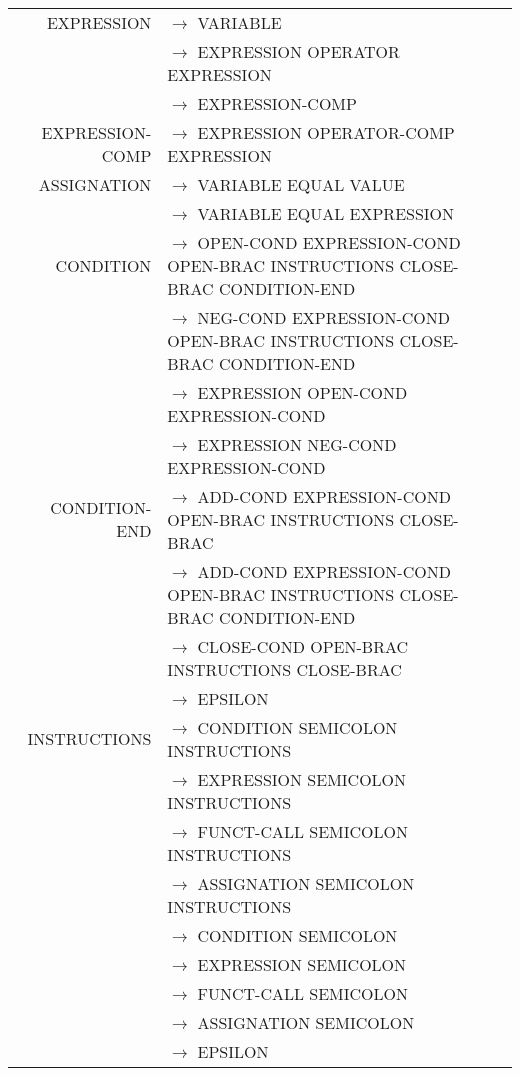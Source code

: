 \documentclass[a4paper,10pt]{article}
\begin{document}
~\\

\hspace{-4.5cm}\begin{tabular}{rl}
\hline
EXPRESSION			& $\rightarrow$ VARIABLE   \\
					& $\rightarrow$ EXPRESSION OPERATOR EXPRESSION \\ 
					& $\rightarrow$ EXPRESSION-COMP \\
EXPRESSION-COMP		& $\rightarrow$ EXPRESSION OPERATOR-COMP EXPRESSION \\
ASSIGNATION			& $\rightarrow$ VARIABLE EQUAL VALUE \\
					& $\rightarrow$ VARIABLE EQUAL EXPRESSION \\
					
CONDITION			& $\rightarrow$ OPEN-COND EXPRESSION-COND OPEN-BRAC INSTRUCTIONS CLOSE-BRAC CONDITION-END\\
					& $\rightarrow$ NEG-COND EXPRESSION-COND OPEN-BRAC INSTRUCTIONS CLOSE-BRAC CONDITION-END\\
					& $\rightarrow$ EXPRESSION OPEN-COND EXPRESSION-COND \\
					& $\rightarrow$ EXPRESSION NEG-COND EXPRESSION-COND \\


CONDITION-END		& $\rightarrow$ ADD-COND EXPRESSION-COND OPEN-BRAC INSTRUCTIONS CLOSE-BRAC \\
					& $\rightarrow$ ADD-COND EXPRESSION-COND OPEN-BRAC INSTRUCTIONS CLOSE-BRAC CONDITION-END \\
					& $\rightarrow$ CLOSE-COND OPEN-BRAC INSTRUCTIONS CLOSE-BRAC\\
					& $\rightarrow$ EPSILON \\
					
					
					
					
					
INSTRUCTIONS		& $\rightarrow$ CONDITION SEMICOLON INSTRUCTIONS\\
					& $\rightarrow$ EXPRESSION SEMICOLON INSTRUCTIONS\\
					& $\rightarrow$ FUNCT-CALL SEMICOLON INSTRUCTIONS\\
					& $\rightarrow$ ASSIGNATION SEMICOLON INSTRUCTIONS\\
					& $\rightarrow$ CONDITION SEMICOLON \\
					& $\rightarrow$ EXPRESSION SEMICOLON \\
					& $\rightarrow$ FUNCT-CALL SEMICOLON \\
					& $\rightarrow$ ASSIGNATION SEMICOLON \\
					& $\rightarrow$ EPSILON \\
					

\end{tabular}
\end{document}
